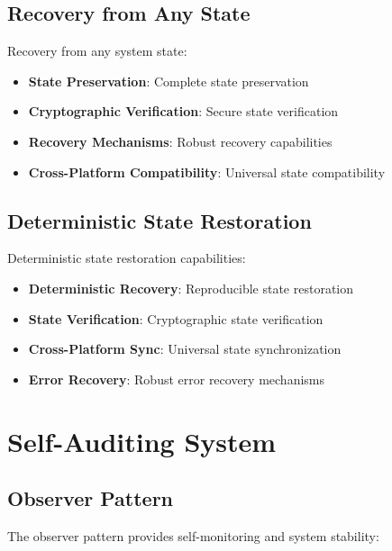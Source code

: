 \documentclass[12pt,a4paper]{article}
\begin{document}
\subsection{Recovery from Any State}
Recovery from any system state:

\begin{itemize}
    \item \textbf{State Preservation}: Complete state preservation
    \item \textbf{Cryptographic Verification}: Secure state verification
    \item \textbf{Recovery Mechanisms}: Robust recovery capabilities
    \item \textbf{Cross-Platform Compatibility}: Universal state compatibility
\end{itemize}

\subsection{Deterministic State Restoration}
Deterministic state restoration capabilities:

\begin{itemize}
    \item \textbf{Deterministic Recovery}: Reproducible state restoration
    \item \textbf{State Verification}: Cryptographic state verification
    \item \textbf{Cross-Platform Sync}: Universal state synchronization
    \item \textbf{Error Recovery}: Robust error recovery mechanisms
\end{itemize}

\newpage

\section{Self-Auditing System}

\subsection{Observer Pattern}
The observer pattern provides self-monitoring and system stability:
\end{document}
